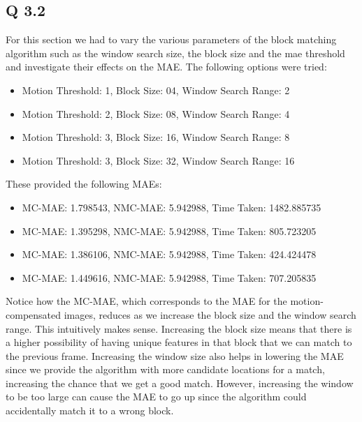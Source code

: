\subsection{Q 3.2}
For this section we had to vary the various parameters of the block matching algorithm such as the window search size,
the block size and the mae threshold and investigate their effects on the MAE. The following options were tried:

\begin{itemize}
    \item Motion Threshold: 1, Block Size: 04, Window Search Range: 2  
    \item Motion Threshold: 2, Block Size: 08, Window Search Range: 4   
    \item Motion Threshold: 3, Block Size: 16, Window Search Range: 8 
    \item Motion Threshold: 3, Block Size: 32, Window Search Range: 16
\end{itemize}

These provided the following MAEs:

\begin{itemize}
    \item MC-MAE: 1.798543, NMC-MAE: 5.942988, Time Taken: 1482.885735
    \item MC-MAE: 1.395298, NMC-MAE: 5.942988, Time Taken:  805.723205
    \item MC-MAE: 1.386106, NMC-MAE: 5.942988, Time Taken:  424.424478     
    \item MC-MAE: 1.449616, NMC-MAE: 5.942988, Time Taken:  707.205835
\end{itemize}

Notice how the MC-MAE, which corresponds to the MAE for the motion-compensated images, reduces as we increase the block
size and the window search range. This intuitively makes sense. Increasing the block size means that there is a higher
possibility of having unique features in that block that we can match to the previous frame. Increasing the window size
also helps in lowering the MAE since we provide the algorithm with more candidate locations for a match, increasing the
chance that we get a good match. However, increasing the window to be too large can cause the MAE to go up since the
algorithm could accidentally match it to a wrong block.

